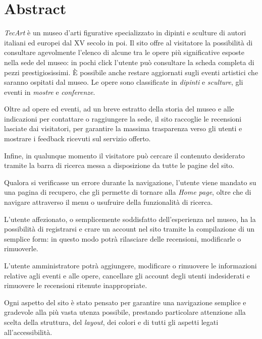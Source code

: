 \section{Abstract}
\label{abstract}
\textit{TecArt} è un museo d'arti figurative specializzato in dipinti e sculture di autori italiani ed europei dal XV secolo in poi. Il sito offre al visitatore la possibilità di consultare agevolmente l'elenco di alcune tra le opere più significative esposte nella sede del museo: in pochi click l'utente può consultare la scheda completa di pezzi prestigiosissimi. È possibile anche restare aggiornati sugli eventi artistici che saranno ospitati dal museo. Le opere sono classificate in \textit{dipinti} e \textit{sculture}, gli eventi in \textit{mostre} e \textit{conferenze}.

Oltre ad opere ed eventi, ad un breve estratto della storia del museo e alle indicazioni per contattare o raggiungere la sede, il sito raccoglie le recensioni lasciate dai visitatori, per garantire la massima trasparenza verso gli utenti e mostrare i feedback ricevuti sul servizio offerto.

Infine, in qualunque momento il visitatore può cercare il contenuto desiderato tramite la barra di ricerca messa a disposizione da tutte le pagine del sito.

Qualora si verificasse un errore durante la navigazione, l'utente viene mandato su una pagina di recupero, che gli permette di tornare alla \textit{Home page}, oltre che di navigare attraverso il menu o usufruire della funzionalità di ricerca.

L'utente affezionato, o semplicemente soddisfatto dell'esperienza nel museo, ha la possibilità di registrarsi e crare un account nel sito tramite la compilazione di un semplice form: in questo modo potrà rilasciare delle recensioni, modificarle o rimuoverle.

L'utente amministratore potrà aggiungere, modificare o rimuovere le informazioni relative agli eventi e alle opere, cancellare gli account degli utenti indesiderati e rimuovere le recensioni ritenute inappropriate.

Ogni aspetto del sito è stato pensato per garantire una navigazione semplice e gradevole alla più vasta utenza possibile, prestando particolare attenzione alla scelta della struttura, del \textit{layout}, dei colori e di tutti gli aspetti legati all'accessibilità.